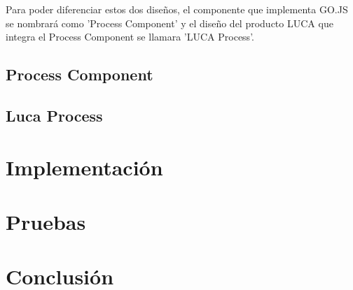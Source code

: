 \documentclass[a4paper,12pt]{article}
\begin{document}
	\vspace{5mm}
	
	Para poder diferenciar estos dos diseños, el componente que implementa GO.JS se nombrará como 'Process Component' y el diseño del producto LUCA que integra el Process Component se llamara 'LUCA Process'.
	
		\subsection{Process Component}
		
		
		\subsection{Luca Process}
	
	\afterpage{\null\newpage}
	\newpage
	
	\section{Implementación}
	
	\afterpage{\null\newpage}
	\newpage
	
	
	\section{Pruebas}
	
	\afterpage{\null\newpage}
	\newpage
	
	
	
	\section{Conclusión}


	\clearpage
	
	
	
	
	\clearpage
\end{document}
